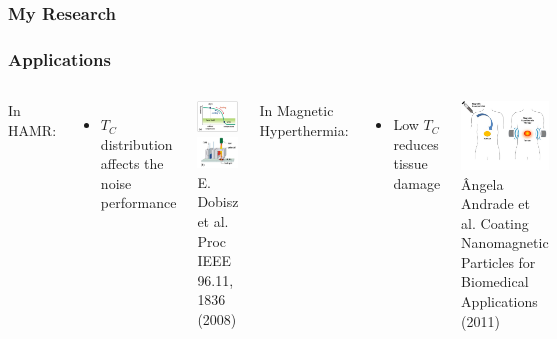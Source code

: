 \documentclass{beamer}
\begin{document}
\begin{frame}
	\frametitle{My Research}
	
\end{frame}

\begin{frame}
	\frametitle{Applications}
	\begin{columns}
		\column{6cm}
		In HAMR\footnotemark[1]:
		\begin{itemize}
			\item{$T_C$ distribution affects the noise performance}
		\end{itemize} \vspace{5mm}
		
		\begin{center}
		\includegraphics[width=2.9cm]{Images/coerc} \hspace{1mm}
		\includegraphics[width=2.9cm]{Images/laser} \\
		\tiny E. Dobisz et al. Proc IEEE 96.11, 1836 (2008)
		\end{center}
		
		\column{6cm}
		In Magnetic Hyperthermia\footnotemark[2]:
		\begin{itemize}
		\item{Low $T_C$ reduces tissue damage}
		\end{itemize}
		
		\begin{center}
		\includegraphics[width=4cm]{Images/person} \\
		\tiny \^{A}ngela Andrade et al. Coating Nanomagnetic Particles for Biomedical Applications (2011)
		\end{center}
	\end{columns}
\end{frame}
\end{document}

